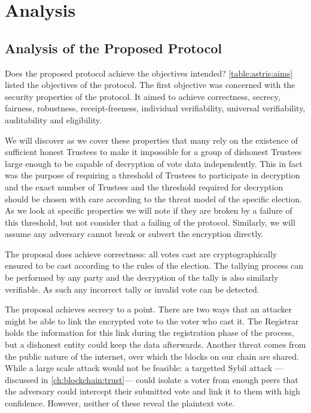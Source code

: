 
\chapter{Analysis}
\label{ch:analysis}

\section{Analysis of the Proposed Protocol}
\label{ch:analysis:analysis}

Does the proposed protocol achieve the objectives intended? \autoref{table:astris:aims} listed the objectives of the protocol. The first objective was concerned with the security properties of the protocol. It aimed to achieve correctness, secrecy, fairness, robustness, receipt-freeness, individual verifiability, universal verifiability, auditability and eligibility.

We will discover as we cover these properties that many rely on the existence of sufficient honest Trustees to make it impossible for a group of dishonest Trustees large enough to be capable of decryption of vote data independently. This in fact was the purpose of requiring a threshold of Trustees to participate in decryption and the exact number of Trustees and the threshold required for decryption should be chosen with care according to the threat model of the specific election. As we look at specific properties we will note if they are broken by a failure of this threshold, but not consider that a failing of the protocol. Similarly, we will assume any adversary cannot break or subvert the encryption directly.

The proposal does achieve correctness: all votes cast are cryptographically ensured to be cast according to the rules of the election. The tallying process can be performed by any party and the decryption of the tally is also similarly verifiable. As such any incorrect tally or invalid vote can be detected.

The proposal achieves secrecy to a point. There are two ways that an attacker might be able to link the encrypted vote to the voter who cast it. The Registrar holds the information for this link during the registration phase of the process, but a dishonest entity could keep the data afterwards. Another threat comes from the public nature of the internet, over which the blocks on our chain are shared. While a large scale attack would not be feasible: a targetted Sybil attack ---discussed in \autoref{ch:blockchain:trust}--- could isolate a voter from enough peers that the adversary could intercept their submitted vote and link it to them with high confidence. However, neither of these reveal the plaintext vote.


